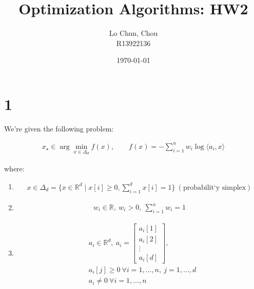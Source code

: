 \documentclass{article}
\title{Optimization Algorithms: HW2}
\author{Lo Chun, Chou \\ R13922136}
\date\today
\begin{document}
\setlength{\parindent}{0pt}
\maketitle 


\section*{1}

We're given the following problem:

\begin{align*}
    x_{\star} \in \arg\min_{x \in \Delta_d} f(x), \qquad f(x) = -\sum_{i=1}^n w_i \log \langle a_i, x \rangle
\end{align*}

where:

\begin{enumerate}
    \item 
    \begin{align*}
        x \in \Delta_d = \{ x \in \mathbb{R}^d \mid x[i] \geq 0, \sum_{i=1}^d x[i] = 1 \} \ (\text{probabilit`y simplex})
    \end{align*}
    \item 
    \begin{align*}
        w_i \in \mathbb{R}, \ w_i > 0, \ \sum_{i=1}^n w_i = 1
    \end{align*}
    \item 
    \begin{align*}
        &a_i \in \mathbb{R}^d, \ 
        a_i =
        \begin{bmatrix}
            a_i[1] \\
            a_i[2] \\
            \vdots \\
            a_i[d]
        \end{bmatrix}, \\ 
        &a_i[j] \geq 0 \ \forall i = 1, \dots, n, \ j = 1, \dots, d \\
        &a_i \neq 0 \ \forall i = 1, \dots, n
    \end{align*}
\end{enumerate}
\end{document}
